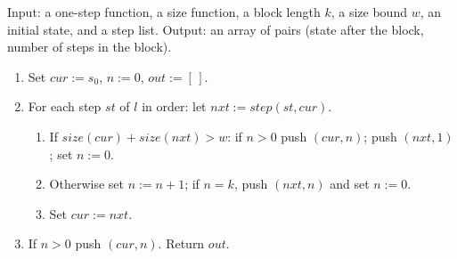 \begin{algorithm}\label{alg:lean-pathsum-blocks}
Input: a one-step function, a size function, a block length $k$, a size bound $w$, an initial
state, and a step list. Output: an array of pairs (state after the block, number of steps in the
block).
\begin{enumerate}
\item Set $cur := s_0$, $n := 0$, $out := [\,]$.
\item For each step $st$ of $l$ in order: let $nxt := \mathit{step}(st, cur)$.
  \begin{enumerate}
  \item If $\mathit{size}(cur)+\mathit{size}(nxt) > w$: if $n>0$ push $(cur,n)$; push $(nxt,1)$;
    set $n:=0$.
  \item Otherwise set $n := n+1$; if $n = k$, push $(nxt, n)$ and set $n := 0$.
  \item Set $cur := nxt$.
  \end{enumerate}
\item If $n>0$ push $(cur,n)$. Return $out$.
\end{enumerate}
\end{algorithm}

